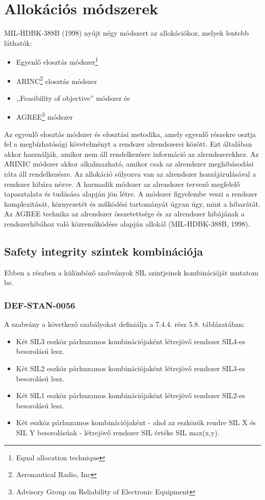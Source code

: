 \section{Allokációs módszerek}
MIL-HDBK-388B (1998) nyújt négy módszert az allokációhoz, melyek lentebb láthatók:
\begin{itemize}
	\item Egyenlő elosztás módszer\footnote{Equal allocation technique}
	\item ARINC\footnote{Aeronautical Radio, Inc} elosztás módszer
	\item ,,Feasibility of objective'' módszer és
	\item AGREE\footnote{Advisory Group on Reliability of Electronic Equipment} módszer
\end{itemize}

Az egyenlő elosztás módszer és elosztási metodika, amely egyenlő részekre osztja fel a megbízhatósági követelményt a rendszer alrendszerei között.
Ezt általában akkor használják, amikor nem áll rendelkezésre információ az alrendszerekhez.
Az ARINIC módszer akkor alkalmazható, amikor csak az alrendszer meghibásodási ráta áll rendelkezésre. 
Az allokáció súlyozva van az alrendszer hozzájárulásával a rendszer hibára nézve.
A harmadik módszer az alrendszer tervező megfelelő tapasztalata és tudásása alapján jön létre.
A módszer figyelembe veszi a rendszer komplexitását, környezetét és működési tartományát úgyan úgy, mint a hibarátát.
Az AGREE technika az alrendszer összetettsége és az alrendszer hibájának a rendszerhibához való közreműködése alapján allokál (MIL-HDBK-388B, 1998).

\subsection{Safety integrity szintek kombinációja}
Ebben a részben a különböző szabványok SIL szintjeinek kombinációját mutatom be.

\subsubsection{DEF-STAN-0056}
A szabvány a következő szabályokat definiálja a 7.4.4. rész 5.8. táblázatában:
\begin{itemize}
	\item Két SIL3 eszköz párhuzamos kombinációjaként létrejövő rendszer SIL4-es besorolású lesz.
	\item Két SIL2 eszköz párhuzamos kombinációjaként létrejövő rendszer SIL3-es besorolású lesz.
	\item Két SIL1 eszköz párhuzamos kombinációjaként létrejövő rendszer SIL2-es besorolású lesz.
	\item Két eszköz párhuzamos kombinációjaként - ahol az eszközök rendre SIL X és SIL Y besorolásúak - létrejövő rendszer SIL értéke SIL max(x,y).
\end{itemize}

